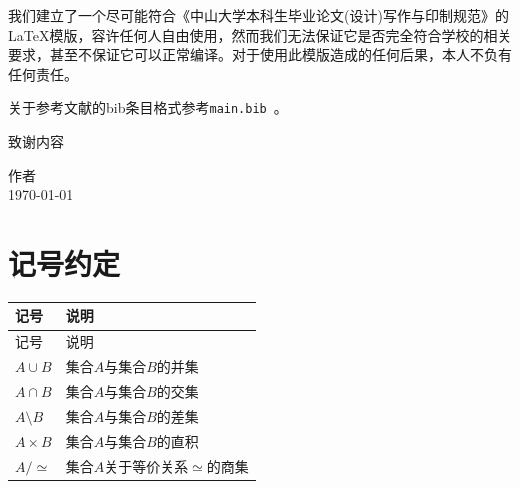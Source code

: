 ﻿\documentclass{sysuthesis}
\begin{document}
我们建立了一个尽可能符合《中山大学本科生毕业论文(设计)写作与印制规范》的\LaTeX 模版，容许任何人自由使用，然而我们无法保证它是否完全符合学校的相关要求，甚至不保证它可以正常编译。对于使用此模版造成的任何后果，本人不负有任何责任。

关于参考文献的bib条目格式参考\texttt{main.bib}~\cite{article}\cite{book}\cite{phdthesis}\cite{inproc}\cite{masterthesis}\cite{manual}\cite{report}\cite{database}\cite{software}\cite{standard}\cite{newspaper}\cite{patent}。

\displayendnotes

\songti


\appendix

\begin{thankto}

	\songti{}
	致谢内容

	\vskip 18pt
	\begin{flushright}
		作者\\
		\today
	\end{flushright}
\end{thankto}

\chapter{记号约定}
\songti{}
\begin{longtable}{ll}
	记号 & 说明\\
	\endfirsthead
	记号 & 说明\\
	\endhead
	\endfoot
	\endlastfoot
	$A \cup B$ & 集合$A$与集合$B$的并集\\
	$A \cap B$ & 集合$A$与集合$B$的交集\\
	$A \setminus B$ & 集合$A$与集合$B$的差集\\
	$A \times B$ & 集合$A$与集合$B$的直积\\
	$A / \simeq$ & 集合$A$关于等价关系$\simeq$的商集\\
\end{longtable}

\backmatter
\end{document}
